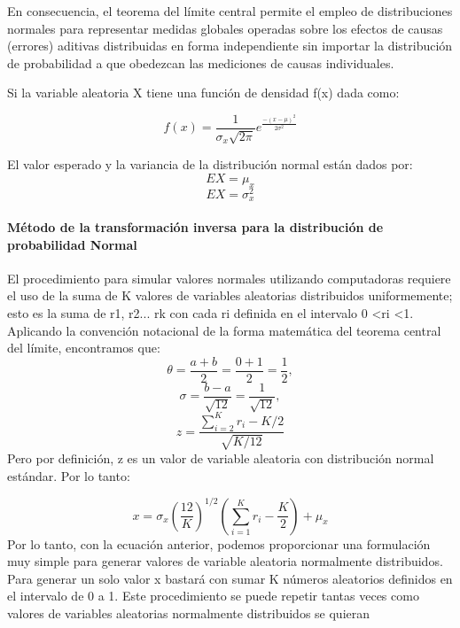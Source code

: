 \documentclass{article}
\begin{document}
  En consecuencia, el teorema del límite central permite el empleo de distribuciones normales para representar medidas globales operadas sobre los efectos de causas (errores)
  aditivas distribuidas en forma independiente sin importar la distribución de probabilidad a que obedezcan las mediciones de causas individuales.

  Si la variable aleatoria X tiene una función de densidad f(x) dada como:

  \begin{equation}
    f(x) = \frac{1}{σ_{x}\sqrt {2\pi}}e^{\frac{-(x-\mu)^2}{2σ^2}}
  \end{equation}

  El valor esperado y la variancia de la distribución normal están dados por:
  \begin{equation}
    EX = \mu_{x}
  \end{equation}
  \begin{equation}
    EX = \sigma_{x}^2
  \end{equation}

  \paragraph{Método de la transformación inversa para la distribución de probabilidad Normal}
  El procedimiento para simular valores normales utilizando computadoras requiere el uso de la suma de K valores de
  variables aleatorias distribuidos uniformemente; esto es la suma de r1, r2... rk con cada ri definida en el intervalo 0 <ri
  <1. Aplicando la convención notacional de la forma matemática del teorema central del límite, encontramos que:
  \begin{equation}
    \theta = \frac{a+b}{2} = \frac{0+1}{2} = \frac{1}{2},
  \end{equation}
  \begin{equation}
    \sigma = \frac{b-a}{\sqrt {12}} = \frac{1}{\sqrt {12}},
  \end{equation}
  \begin{equation}
    z = \frac{\sum_{i=2}^{K}r_{i}-K/2}{\sqrt {K/12}}
  \end{equation}
  Pero por definición, z es un valor de variable aleatoria con distribución normal estándar.
  Por lo tanto:

  \begin{equation}
    x = \sigma_{x}(\frac{12}{K})^{1/2}(\sum_{i=1}^{K}r_{i}-\frac{K}{2}) + \mu_{x}
  \end{equation}
  Por lo tanto, con la ecuación anterior, podemos proporcionar una formulación muy simple para generar valores de
  variable aleatoria normalmente distribuidos. Para generar un solo valor x bastará con sumar K números aleatorios
  definidos en el intervalo de 0 a 1. Este procedimiento se puede repetir tantas veces como valores de variables aleatorias
  normalmente distribuidos se quieran
\end{document}
